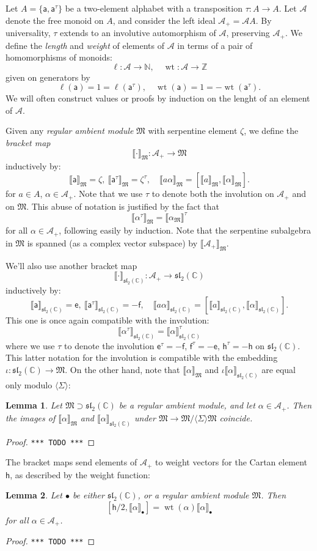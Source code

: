 \documentclass{article}
\def\MISS{\texttt{*** TODO ***}}
\def\llb{\llbracket}
\def\rrb{\rrbracket}
\def\fsl{\mathfrak{sl}}
\def\fM{\mathfrak{M}}
\def\sA{\mathscr{A}}
\def\ZZ{\mathbb{Z}}
\def\NN{\mathbb{N}}
\def\CC{\mathbb{C}}
\def\inv{\tau} %
\DeclareMathOperator{\wt}{\mathrm{wt}}
\def\a{\mathsf{a}}
\def\e{\mathsf{e}}
\def\h{\mathsf{h}}
\def\f{\mathsf{f}}
\newtheorem{lem}{Lemma}
\theoremstyle{definition}
\begin{document}
Let $A = \{\a,\a^\inv\}$ be a two-element
alphabet with a transposition $\inv:A \to A$.
Let $\sA$ denote the free monoid on $A$,
and consider the left ideal
$\sA_+ = \sA A$.
By universality, $\inv$ extends to an involutive
automorphism of $\sA$, preserving $\sA_+$. 
We define the \emph{length} and \emph{weight}
of elements of $\sA$ in terms of a pair of homomorphisms
of monoids:
$$
\ell : \sA \to \NN,\quad \wt : \sA \to \ZZ
$$
given on generators by
$$
\ell(\a) =1= \ell(\a^\inv),\quad 
\wt(\a) =1= -\wt(\a^\inv).
$$
We will often construct values or proofs by induction on the
lenght of an element of $\sA$.

Given any \emph{regular
ambient module} $\fM$ with serpentine element $\zeta$, we define the \emph{bracket map}
$$
\llb\cdot\rrb_\fM : \sA_+ \to \fM
$$
inductively by:
$$ \llb\a\rrb_\fM=\zeta,\ \llb\a^\inv\rrb_\fM=\zeta^\inv,\quad
\llb a \alpha\rrb_\fM = [ \llb a\rrb_\fM, \llb \alpha\rrb_\fM ].
$$
for $a \in A$, $\alpha\in\sA_+$.
Note that we use $\inv$ to denote
both the involution on $\sA_+$ and on $\fM$.
This abuse of notation is justified by the fact that 
$$
\llb\alpha^\inv\rrb_\fM = \llb\alpha_\fM\rrb^\inv
$$
for all $\alpha\in\sA_+$, following easily
by induction. Note that the serpentine subalgebra
in $\fM$ is spanned (as a complex vector subspace) by $\llb\sA_+\rrb_\fM$.

We'll also use another bracket map
$$
\llb\cdot\rrb_{\fsl_2(\CC)} : \sA_+ \to \fsl_2(\CC)
$$
inductively by:
$$ \llb\a\rrb_{\fsl_2(\CC)}=\e,\ \llb\a^\inv\rrb_{\fsl_2(\CC)}=-\f,\quad
\llb a \alpha\rrb_{\fsl_2(\CC)} = [ \llb a\rrb_{\fsl_2(\CC)}, \llb\alpha\rrb_{\fsl_2(\CC)} ]. $$
This one is once again compatible with the involution:
$$ \llb\alpha^\inv\rrb_{\fsl_2(\CC)} = \llb\alpha\rrb_{\fsl_2(\CC)}^\inv $$
where
we use $\inv$ to denote the involution 
$\e^\inv=-\f$, $\f^\inv=-\e$, $\h^\inv=-\h$
on $\fsl_2(\CC)$. This latter notation for the involution is compatible
with the embedding $\iota:\fsl_2(\CC)\to\fM$.
On the other hand, note that
$\llb\alpha\rrb_\fM$ and $\iota\llb\alpha\rrb_{\fsl_2(\CC)}$
are equal only modulo $\langle\Sigma\rangle$:
\begin{lem}
        Let $\fM \supset \fsl_2(\CC)$ be a regular ambient module, and
        let $\alpha \in \sA_+$. Then
        the images of $\llb \alpha\rrb_\fM$ and
        $\llb \alpha\rrb_{\fsl_2(\CC)}$ under $\fM \to \fM / \langle\Sigma\rangle\fM$
        coincide.
\end{lem}
\begin{proof}
\MISS
\end{proof}
The bracket maps
send elements of $\sA_+$ to
weight vectors for the Cartan element $\h$,
as described by the weight function:
\begin{lem}
        Let $\bullet$ be either
        $\fsl_2(\CC)$,
        or a regular ambient module $\fM$. Then
        $$[\h/2, \llb\alpha\rrb_\bullet] = \wt(\alpha) \llb\alpha\rrb_\bullet$$
        for all $\alpha\in\sA_+$.
\end{lem}
\begin{proof}\MISS\end{proof}
\end{document}
